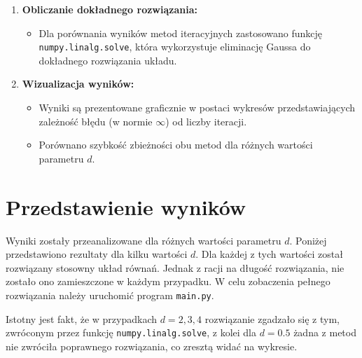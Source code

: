 \documentclass[a4paper,12pt]{article}
\begin{document}
\begin{enumerate}
    \item \textbf{Obliczanie dokładnego rozwiązania:}
    \begin{itemize}
        \item Dla porównania wyników metod iteracyjnych zastosowano funkcję \texttt{numpy.linalg.solve}, która wykorzystuje eliminację Gaussa do dokładnego rozwiązania układu.
    \end{itemize}
    
    \item \textbf{Wizualizacja wyników:}
    \begin{itemize}
        \item Wyniki są prezentowane graficznie w postaci wykresów przedstawiających zależność błędu (w normie \( \infty \)) od liczby iteracji.
        \item Porównano szybkość zbieżności obu metod dla różnych wartości parametru \(d\).
    \end{itemize}
\end{enumerate}

\section{Przedstawienie wyników}

Wyniki zostały przeanalizowane dla różnych wartości parametru \(d\). Poniżej przedstawiono rezultaty dla kilku wartości \(d\). Dla każdej z tych wartości został rozwiązany stosowny układ równań. Jednak z racji na długość rozwiązania, nie zostało ono zamieszczone w każdym przypadku. W celu zobaczenia pełnego rozwiązania należy uruchomić program \texttt{main.py}. 

Istotny jest fakt, że w przypadkach \(d = 2, 3, 4\) rozwiązanie zgadzało się z tym, zwróconym przez funkcję \texttt{numpy.linalg.solve}, z kolei dla \(d = 0.5\) żadna z metod nie zwróciła poprawnego rozwiązania, co zresztą widać na wykresie.
\end{document}
